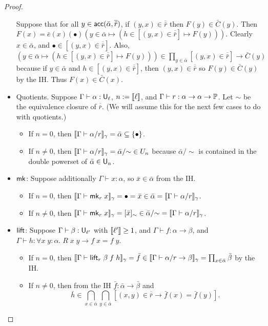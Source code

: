 \begin{proof}
\begin{itemize}
Suppose that for all $y\in\mathsf{acc}(\bar\alpha,\overline{\bar r})$, if $(y,x)\in\overline{\bar r}$ then $F(y)\in\bar C(y)$. Then $F(x)=\bar e(x)(\bullet)(y\in \bar\alpha\mapsto(h\in[(y,x)\in\overline{\bar r}]\mapsto F(y)))$. Clearly $x\in\bar\alpha$, and $\bullet\in[(y,x)\in\overline{\bar r}]$. Also, $(y\in \bar\alpha\mapsto(h\in[(y,x)\in\overline{\bar r}]\mapsto F(y)))\in\prod_{y\in\bar\alpha}[(y,x)\in\overline{\bar r}]\to\bar C(y)$ because if $y\in\bar\alpha$ and $h\in[(y,x)\in\overline{\bar r}]$, then $(y,x)\in\overline{\bar r}$ so $F(y)\in\bar C(y)$ by the IH. Thus $F(x)\in\bar C(x)$.
\item Quotients. Suppose $\Gamma\vdash\alpha:\U_\ell$, $n:=\llbracket \ell\rrbracket$, and $\Gamma\vdash r:\alpha\to\alpha\to\P$. Let $\sim$ be the equivalence closure of $\overline{\bar r}$. (We will assume this for the next few cases to do with quotients.)
\begin{itemize}
\item If $n=0$, then $\scott{\Gamma\vdash \alpha/r}_\gamma=\bar\alpha\subseteq\{\bullet\}$.
\item If $n\ne 0$, then $\scott{\Gamma\vdash \alpha/r}_\gamma=\bar\alpha/{\sim}\in U_n$ because $\bar\alpha/{\sim}$ is contained in the double powerset of $\bar\alpha\in\mathsf{U}_n$.
\end{itemize}
\item $\mathsf{mk}$: Suppose additionally $\Gamma\vdash x:\alpha$, so $\bar x\in\bar \alpha$ from the IH.
\begin{itemize}
\item If $n=0$, then $\scott{\Gamma\vdash\mk_r\;x}_\gamma=\bullet=\bar x\in\bar\alpha=\scott{\Gamma\vdash \alpha/r}_\gamma$.
\item If $n\ne 0$, then $\scott{\Gamma\vdash\mk_r\;x}_\gamma=[\bar x]_{\sim}\in\bar\alpha/{\sim}=\scott{\Gamma\vdash \alpha/r}_\gamma$.
\end{itemize}
\item $\mathsf{lift}$: Suppose $\Gamma\vdash\beta:\U_{\ell'}$ with $\llbracket \ell'\rrbracket\ge 1$, and $\Gamma\vdash f:\alpha\to\beta$, and\\
$\Gamma\vdash h:\forall x\;y:\alpha.\;R\;x\;y\to f\;x=f\;y$.
\begin{itemize}
\item If $n=0$, then $\scott{\Gamma\vdash\lift_r\;\beta\;f\;h}_\gamma=\bar f\in\scott{\Gamma\vdash\alpha/r\to\beta}_\gamma=\prod_{x\in\bar\alpha}\bar\beta$ by the IH.
\item If $n\ne 0$, then from the IH $\bar f:\bar\alpha\to\bar\beta$ and
$$\bar h\in\bigcap_{x\in\bar\alpha}\bigcap_{y\in\bar\alpha}[(x,y)\in\overline{\bar r}\to\bar f(x)=\bar f(y)].$$

\end{itemize}
\end{itemize}
\end{proof}
